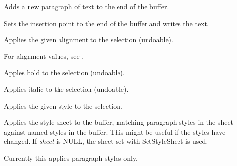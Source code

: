 \label{wxrichtextctrladdparagraph}


Adds a new paragraph of text to the end of the buffer.

\label{wxrichtextctrlappendtext}


Sets the insertion point to the end of the buffer and writes the text.

\label{wxrichtextctrlapplyalignmenttoselection}


Applies the given alignment to the selection (undoable).

For alignment values, see .

\label{wxrichtextctrlapplyboldtoselection}


Apples bold to the selection (undoable).

\label{wxrichtextctrlapplyitalictoselection}


Applies italic to the selection (undoable).

\label{wxrichtextctrlapplystyle}


Applies the given style to the selection.

\label{wxrichtextctrlapplystylesheet}


Applies the style sheet to the buffer, matching paragraph styles in the sheet against named styles
in the buffer. This might be useful if the styles have changed. If {\it sheet} is NULL, the
sheet set with SetStyleSheet is used.

Currently this applies paragraph styles only.

